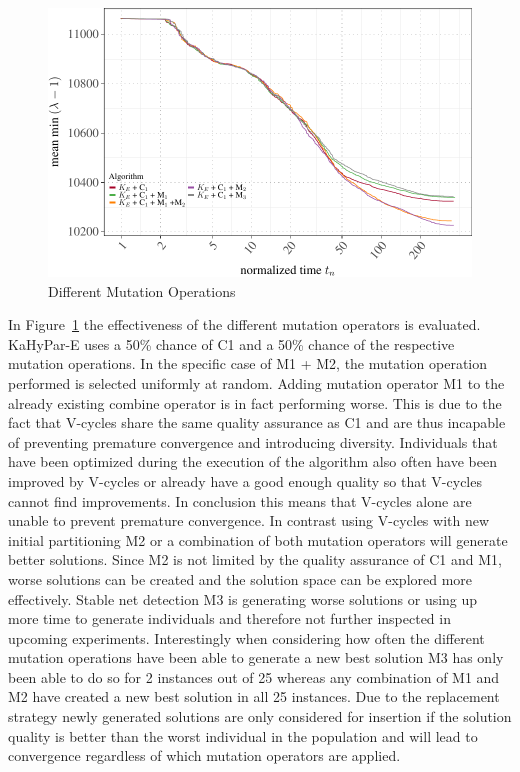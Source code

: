 \documentclass[a4paper,12pt,titlepage, BCOR7mm,headsepline]{scrbook}
\numberwithin{equation}{section}
\begin{document}
\begin{figure}[H]

\begin{center}
\includegraphics{rnw/tuning_subset_plots/mutation_plot-1}\caption{Different Mutation Operations}\label{fig:mutateoperatorevaluation}
\end{center}

\end{figure}
In Figure~\ref{fig:mutateoperatorevaluation} the effectiveness of the different mutation operators is evaluated. KaHyPar-E uses a 50\% chance of C1 and a 50\% chance of the respective mutation operations. In the specific case of M1 + M2, the mutation operation performed is selected uniformly at random. Adding mutation operator M1 to the already existing combine operator is in fact performing worse. This is due to the fact that V-cycles share the same quality assurance as C1 and are thus incapable of preventing premature convergence and introducing diversity. Individuals that have been optimized during the execution of the algorithm also often have been improved by V-cycles or already have a good enough quality so that V-cycles cannot find improvements. In conclusion this means that V-cycles alone are unable to prevent premature convergence. In contrast using V-cycles with new initial partitioning M2 or a combination of both mutation operators will generate better solutions. Since M2 is not limited by the quality assurance of C1 and M1, worse solutions can be created and the solution space can be explored more effectively. Stable net detection M3 is generating worse solutions or using up more time to generate individuals and therefore not further inspected in upcoming experiments. Interestingly when considering how often the different mutation operations have been able to generate a new best solution M3 has only been able to do so for 2 instances out of 25 whereas any combination of M1 and M2 have created a new best solution in all 25 instances. %
Due to the replacement strategy newly generated solutions are only considered for insertion if the solution quality is better than the worst individual in the population and will lead to convergence regardless of which mutation operators are applied. 
\end{document}
